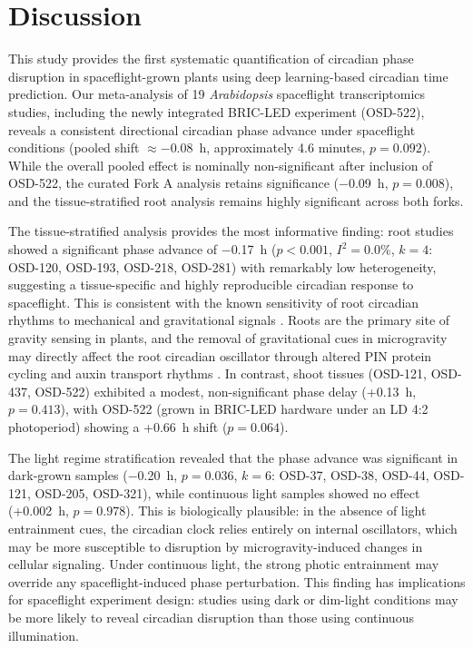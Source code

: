 \documentclass[11pt,a4paper]{article}
\begin{document}
\section*{Discussion}

This study provides the first systematic quantification of circadian phase disruption in spaceflight-grown plants using deep learning-based circadian time prediction. Our meta-analysis of 19 \textit{Arabidopsis} spaceflight transcriptomics studies, including the newly integrated BRIC-LED experiment (OSD-522), reveals a consistent directional circadian phase advance under spaceflight conditions (pooled shift $\approx -0.08$~h, approximately 4.6 minutes, $p = 0.092$). While the overall pooled effect is nominally non-significant after inclusion of OSD-522, the curated Fork A analysis retains significance ($-$0.09~h, $p = 0.008$), and the tissue-stratified root analysis remains highly significant across both forks.

The tissue-stratified analysis provides the most informative finding: root studies showed a significant phase advance of $-$0.17~h ($p < 0.001$, $I^2 = 0.0\%$, $k = 4$: OSD-120, OSD-193, OSD-218, OSD-281) with remarkably low heterogeneity, suggesting a tissue-specific and highly reproducible circadian response to spaceflight. This is consistent with the known sensitivity of root circadian rhythms to mechanical and gravitational signals \citep{Mancuso2019}. Roots are the primary site of gravity sensing in plants, and the removal of gravitational cues in microgravity may directly affect the root circadian oscillator through altered PIN protein cycling and auxin transport rhythms \citep{Rakusova2011}. In contrast, shoot tissues (OSD-121, OSD-437, OSD-522) exhibited a modest, non-significant phase delay (+0.13~h, $p = 0.413$), with OSD-522 (grown in BRIC-LED hardware under an LD 4:2 photoperiod) showing a +0.66~h shift ($p = 0.064$).

The light regime stratification revealed that the phase advance was significant in dark-grown samples ($-$0.20~h, $p = 0.036$, $k = 6$: OSD-37, OSD-38, OSD-44, OSD-121, OSD-205, OSD-321), while continuous light samples showed no effect (+0.002~h, $p = 0.978$). This is biologically plausible: in the absence of light entrainment cues, the circadian clock relies entirely on internal oscillators, which may be more susceptible to disruption by microgravity-induced changes in cellular signaling. Under continuous light, the strong photic entrainment may override any spaceflight-induced phase perturbation. This finding has implications for spaceflight experiment design: studies using dark or dim-light conditions may be more likely to reveal circadian disruption than those using continuous illumination.
\end{document}

